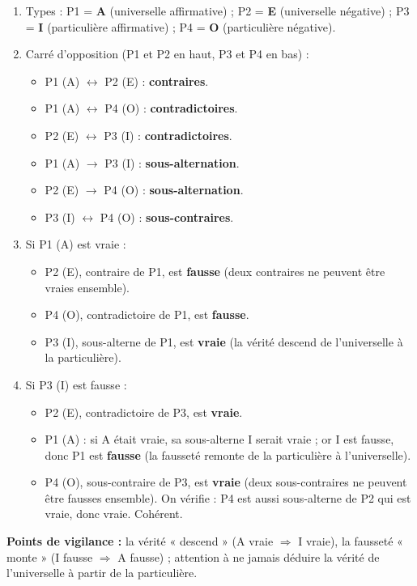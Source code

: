 \documentclass[11pt]{article}
\begin{document}
\begin{corrige}
\begin{enumerate}
    \item Types : P1 = \textbf{A} (universelle affirmative) ; P2 = \textbf{E} (universelle négative) ; P3 = \textbf{I} (particulière affirmative) ; P4 = \textbf{O} (particulière négative).
    \item Carré d'opposition (P1 et P2 en haut, P3 et P4 en bas) :
    \begin{itemize}
        \item P1 (A) $\longleftrightarrow$ P2 (E) : \textbf{contraires}.
        \item P1 (A) $\longleftrightarrow$ P4 (O) : \textbf{contradictoires}.
        \item P2 (E) $\longleftrightarrow$ P3 (I) : \textbf{contradictoires}.
        \item P1 (A) $\longrightarrow$ P3 (I) : \textbf{sous-alternation}.
        \item P2 (E) $\longrightarrow$ P4 (O) : \textbf{sous-alternation}.
        \item P3 (I) $\longleftrightarrow$ P4 (O) : \textbf{sous-contraires}.
    \end{itemize}
    \item Si P1 (A) est vraie :
    \begin{itemize}
        \item P2 (E), contraire de P1, est \textbf{fausse} (deux contraires ne peuvent être vraies ensemble).
        \item P4 (O), contradictoire de P1, est \textbf{fausse}.
        \item P3 (I), sous-alterne de P1, est \textbf{vraie} (la vérité descend de l'universelle à la particulière).
    \end{itemize}
    \item Si P3 (I) est fausse :
    \begin{itemize}
        \item P2 (E), contradictoire de P3, est \textbf{vraie}.
        \item P1 (A) : si A était vraie, sa sous-alterne I serait vraie ; or I est fausse, donc P1 est \textbf{fausse} (la fausseté remonte de la particulière à l'universelle).
        \item P4 (O), sous-contraire de P3, est \textbf{vraie} (deux sous-contraires ne peuvent être fausses ensemble). On vérifie : P4 est aussi sous-alterne de P2 qui est vraie, donc vraie. Cohérent.
    \end{itemize}
\end{enumerate}
\textbf{Points de vigilance :} la vérité « descend » (A vraie $\Rightarrow$ I vraie), la fausseté « monte » (I fausse $\Rightarrow$ A fausse) ; attention à ne jamais déduire la vérité de l'universelle à partir de la particulière.
\end{corrige}
\end{document}
